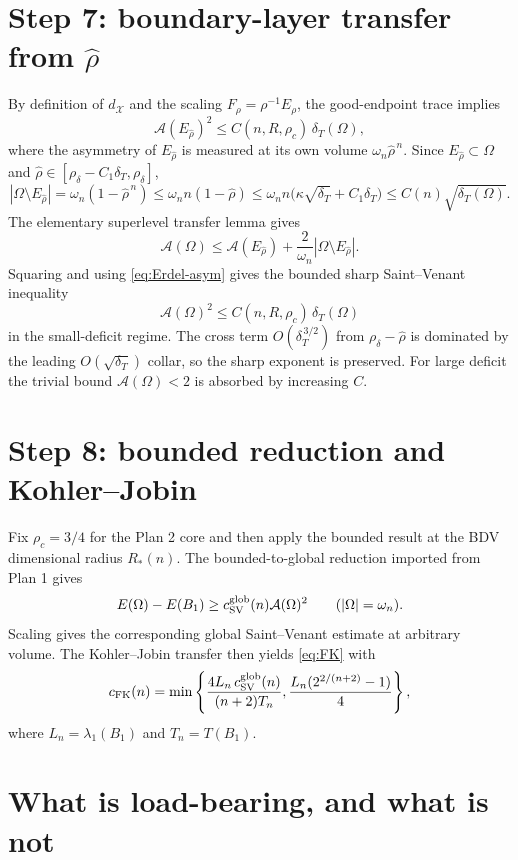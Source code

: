 \documentclass[11pt]{article}
\theoremstyle{definition}
\newcommand{\Om}{\Omega}
\newcommand{\Fr}{\mathcal A}
\newcommand{\X}{\mathcal X}
\newcommand{\rdel}{\rho_\delta}
\newcommand{\rhad}{\widehat\rho}
\begin{document}
\section{Step 7: boundary-layer transfer from $\rhad$}

By definition of $d_\X$ and the scaling $F_\rho=\rho^{-1}E_\rho$,
the good-endpoint trace implies
\begin{equation}\label{eq:Erdel-asym}
  \Fr(E_{\rhad})^2\le C(n,R,\rho_c)\,\delta_T(\Om),
\end{equation}
where the asymmetry of $E_{\rhad}$ is measured at its own volume
$\omega_n\rhad^{\,n}$.  Since $E_{\rhad}\subset\Om$ and
$\rhad\in[\rdel-C_1\delta_T,\rdel]$,
\[
  |\Om\setminus E_{\rhad}|
  =\omega_n(1-\rhad^{\,n})
  \le \omega_n n(1-\rhad)
  \le \omega_n n\bigl(\kappa\sqrt{\delta_T}+C_1\delta_T\bigr)
  \le C(n)\sqrt{\delta_T(\Om)}.
\]
The elementary superlevel transfer lemma gives
\[
  \Fr(\Om)\le \Fr(E_{\rhad})
  +\frac{2}{\omega_n}|\Om\setminus E_{\rhad}|.
\]
Squaring and using \eqref{eq:Erdel-asym} gives the bounded sharp
Saint--Venant inequality
\begin{equation}\label{eq:bounded-SV}
  \Fr(\Om)^2\le C(n,R,\rho_c)\,\delta_T(\Om)
\end{equation}
in the small-deficit regime.  The cross term
$O(\delta_T^{\,3/2})$ from $\rdel-\rhad$ is dominated by the leading
$O(\sqrt{\delta_T})$ collar, so the sharp exponent is preserved.  For
large deficit the trivial bound $\Fr(\Om)<2$ is absorbed by
increasing $C$.

\section{Step 8: bounded reduction and Kohler--Jobin}

Fix $\rho_c=3/4$ for the Plan 2 core and then apply the bounded result
at the BDV dimensional radius $R_*(n)$.  The bounded-to-global
reduction imported from Plan 1 gives
\[
  E(\Om)-E(B_1)\ge c_{\rm SV}^{\rm glob}(n)\Fr(\Om)^2
  \qquad (|\Om|=\omega_n).
\]
Scaling gives the corresponding global Saint--Venant estimate at
arbitrary volume.  The Kohler--Jobin transfer then yields
\eqref{eq:FK} with
\[
  c_{\rm FK}(n)=
  \min\left\{
    \frac{4L_n\,c_{\rm SV}^{\rm glob}(n)}{(n+2)T_n},
    \frac{L_n(2^{2/(n+2)}-1)}{4}
  \right\},
\]
where $L_n=\lambda_1(B_1)$ and $T_n=T(B_1)$.

\section{What is load-bearing, and what is not}
\end{document}
